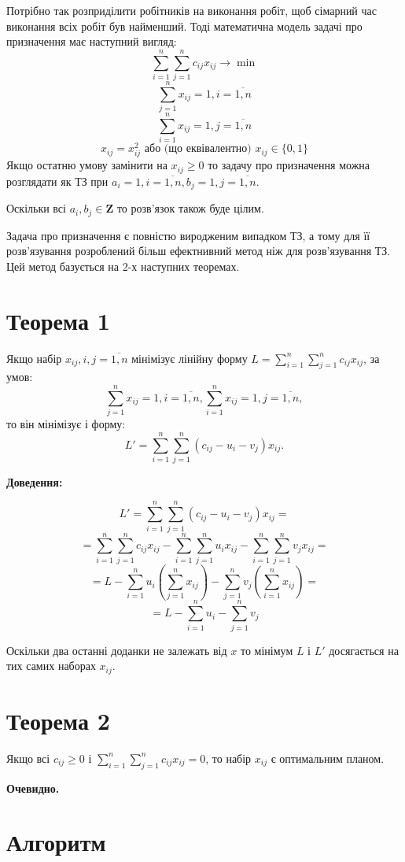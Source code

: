 \documentclass[12pt,a4paper]{report}
\begin{document}
Потрібно так розприділити робітників на виконання робіт, щоб сімарний час виконання всіх робіт був найменший. Тоді математична модель задачі про призначення має наступний вигляд:
\[ \sum_{i=1}^n \sum_{j=1}^n c_{ij} x_{ij} \to \min \]
\[ \sum_{j=1}^n x_{ij} = 1, i = \overline{1,n} \]
\[ \sum_{i=1}^n x_{ij} = 1, j = \overline{1,n} \]
\[ x_{ij} = x_{ij}^2 \mbox{ або (що еквівалентно) } x_{ij} \in \{0,1\} \]
Якщо остатню умову замінити на $x_{ij} \geq 0$ то задачу про призначення можна розглядати як ТЗ при $a_i=1, i = \overline{1,n}, b_j=1, j = \overline{1,n}$.

Оскільки всі $a_i, b_j \in \mathbf{Z}$ то розв’язок також буде цілим.

Задача про призначення є повністю виродженим випадком ТЗ, а тому для її розв’язування розроблений більш ефектнивний метод ніж для розв’язування ТЗ. Цей метод базується на 2-х наступних теоремах.

\section{Теорема 1}

Якщо набір $x_{ij}, i,j=\overline{1,n}$ мінімізує лінійну форму $ L = \sum_{i=1}^n \sum_{j=1}^n c_{ij} x_{ij} $, за умов:
\[ \sum_{j=1}^n x_{ij} = 1, i = \overline{1,n},  \sum_{i=1}^n x_{ij} = 1, j = \overline{1,n}, \]
то він мінімізує і форму:
\[ L' = \sum_{i=1}^n \sum_{j=1}^n (c_{ij} - u_i - v_j) x_{ij}. \]

{\bf Доведення:}

\[ L' = \sum_{i=1}^n \sum_{j=1}^n (c_{ij} - u_i - v_j) x_{ij} = \]
\[ = \sum_{i=1}^n \sum_{j=1}^n c_{ij} x_{ij} - \sum_{i=1}^n \sum_{j=1}^n u_i x_{ij} - \sum_{i=1}^n \sum_{j=1}^n v_j x_{ij} = \]
\[ = L - \sum_{i=1}^n u_i (\sum_{j=1}^n x_{ij}) - \sum_{j=1}^n v_j (\sum_{i=1}^n x_{ij}) = \]
\[ = L - \sum_{i=1}^n u_i - \sum_{j=1}^n v_j \]

Оскільки два останні доданки не залежать від $x$ то мінімум $L$ і $L'$ досягається на тих самих наборах $x_{ij}$.

\section{Теорема 2}

Якщо всі $c_{ij} \geq 0$ і $ \sum_{i=1}^n \sum_{j=1}^n c_{ij} x_{ij} = 0$, то набір $x_{ij}$ є оптимальним планом.

{\bf Очевидно.}

\section{Алгоритм}
\end{document}
